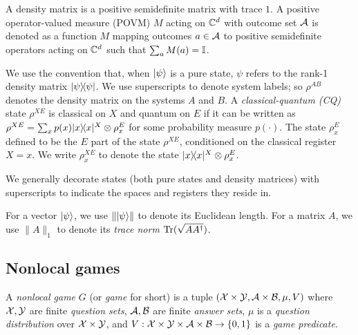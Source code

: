 A density matrix is a positive semidefinite matrix with trace $1$. A positive operator-valued measure (POVM) $M$ acting on $\mathbb{C}^d$ with outcome set $\mathcal{A}$ is denoted as a function $M$ mapping outcomes $a \in \mathcal{A}$ to positive semidefinite operators acting on $\mathbb{C}^d$ such that $\sum_a M(a) = \mathbb{I}$. 

We use the convention that, when ${|\psi\rangle}$ is a pure state, $\psi$ refers to the rank-1 density matrix $|\psi\rangle\! \langle \psi|$. We use superscripts to denote system labels; so $\rho^{AB}$ denotes the density matrix on the systems $A$ and $B$. A \emph{classical-quantum (CQ)} state $\rho^{XE}$ is classical on $X$ and quantum on $E$ if it can be written as $\rho^{XE} = \sum_{x} p(x) |x\rangle\! \langle x|^X \otimes \rho^E_x$ for some probability measure $p(\cdot)$. The state $\rho^E_x$ defined to be the $E$ part of the state $\rho^{XE}$, conditioned on the classical register $X = x$. We write $\rho^{XE}_x$ to denote the state $|x\rangle\! \langle x|^X \otimes \rho^E_x$. %

We generally decorate states (both pure states and density matrices) with superscripts to indicate the spaces and registers they reside in. 


For a vector ${|\psi\rangle}$, we use $\| {|\psi\rangle} \|$ to denote its Euclidean length. For a matrix $A$, we use $\| A \|_1$ to denote its \emph{trace norm} $\mbox{\rm Tr}(\sqrt{A A^\dagger})$. 




\subsection{Nonlocal games}

\begin{definition}
A \emph{nonlocal game} $G$ (or \emph{game} for short) is a tuple $(\mathcal{X} \times \mathcal{Y},\mathcal{A} \times \mathcal{B},\mu,V)$ where $\mathcal{X}, \mathcal{Y}$ are finite \emph{question sets}, $\mathcal{A}, \mathcal{B}$ are finite \emph{answer sets}, $\mu$ is a \emph{question distribution} over $\mathcal{X} \times \mathcal{Y}$, and $V: \mathcal{X} \times \mathcal{Y} \times \mathcal{A} \times \mathcal{B} \to \{0,1\}$ is a \emph{game predicate}.
\end{definition}

